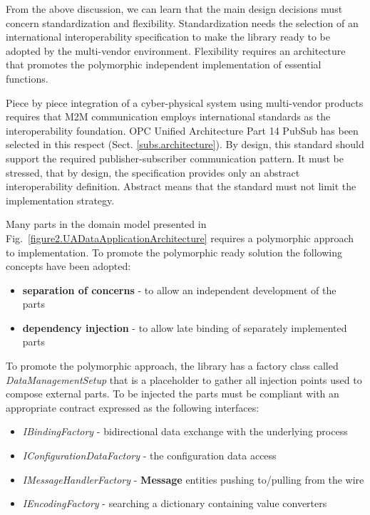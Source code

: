 \documentclass[runningheads]{llncs}
\begin{document}
From the above discussion, we can learn that the main design decisions must concern standardization and flexibility. Standardization needs the selection of an international interoperability specification to make the library ready to be adopted by the multi-vendor environment. Flexibility requires an architecture that promotes the polymorphic independent implementation of essential functions.

Piece by piece integration of a cyber-physical system using multi-vendor products requires that M2M communication employs international standards as the interoperability foundation. OPC Unified Architecture Part 14 PubSub has been selected in this respect (Sect. \ref{subs.architecture}). By design, this standard should support the required publisher-subscriber communication pattern. It must be stressed, that by design, the specification provides only an abstract interoperability definition. Abstract means that the standard must not limit the implementation strategy.

Many parts in the domain model presented in Fig.~\ref{figure2.UADataApplicationArchitecture} requires a polymorphic approach to implementation. To promote the polymorphic ready solution the following concepts have been adopted:

\begin{itemize}
      \item \textbf{separation of concerns} - to allow an independent development of the parts~\cite{RefWorks:doc:5d92609be4b02eb43d372bd1}
      \item \textbf{dependency injection} - to allow late binding of separately implemented parts~\cite{RefWorks:doc:5d925b77e4b030b4e0596f5d}
\end{itemize}

To promote the polymorphic approach, the library has a factory class called \emph{DataManagementSetup} that is a placeholder to gather all injection points used to compose external parts. To be injected the parts must be compliant with an appropriate contract expressed as the following interfaces:

\begin{itemize}
      \item \emph{IBindingFactory} - bidirectional data exchange with the underlying process
      \item \emph{IConfigurationDataFactory} - the configuration data access
      \item \emph{IMessageHandlerFactory} - \textbf{Message} entities pushing to/pulling from the wire
      \item \emph{IEncodingFactory} - searching a dictionary containing value converters
\end{itemize}
\end{document}
